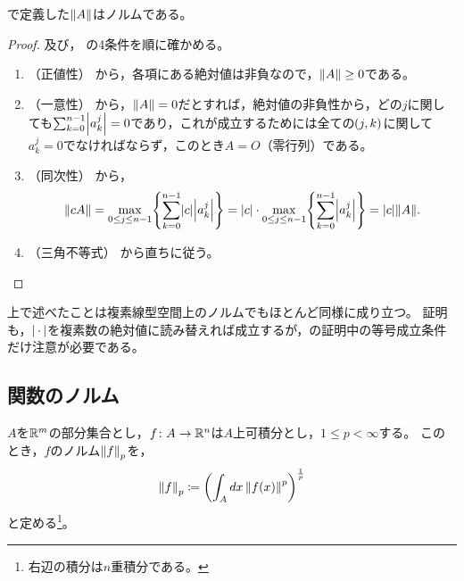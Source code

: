 \documentclass[b5paper,draft]{ltjsbook}
\begin{document}
\begin{prop}
    で定義した$\norm{A}$はノルムである。
    \begin{proof}
        及び，
        の4条件を順に確かめる。
        \begin{enumerate}[label=(\roman*)]
            \item （正値性）
            から，各項にある絶対値は非負なので，$\norm{A} \geq 0$である。

            \item （一意性）
            から，$\norm{A}=0$だとすれば，絶対値の非負性から，どの$j$に関しても$\sum_{k=0}^{n-1}\abs{a^j_k}=0$であり，これが成立するためには全ての$\pare{j,k}$に関して$a^j_k=0$でなければならず，このとき$A=O$（零行列）である。

            \item （同次性）
            から，
            \begin{equation}
                \norm{cA}=\max_{0\leq j\leq n-1} \bra{\sum_{k=0}^{n-1} \abs{c}\abs{a^j_k}}=\abs{c}\cdot \max_{0\leq j\leq n-1} \bra{\sum_{k=0}^{n-1} \abs{a^j_k}}=\abs{c}\norm{A}.
            \end{equation}

            \item （三角不等式）
            から直ちに従う。
        \end{enumerate}
    \end{proof}
\end{prop}

\begin{rem}
    上で述べたことは複素線型空間上のノルムでもほとんど同様に成り立つ。
    証明も，$\abs{\dummy}$を複素数の絶対値に読み替えれば成立するが，の証明中の等号成立条件だけ注意が必要である。
\end{rem}


\subsection{関数のノルム}
\begin{defi}[$L^p$ノルム]
    $A$を$\mathbb{R}^m$の部分集合とし，$f\colon A\to \mathbb{R}^n$は$A$上可積分とし，$1\leq p <\infty$する。
    このとき，$f$のノルム$\norm{f}_p$を，
    \begin{equation}
        \norm{f}_p \coloneqq \pare{\int_A dx\, \norm{\fun{f}{x}}^p}^{\frac{1}{p}}
    \end{equation}
    と定める\footnote{右辺の積分は$n$重積分である。}。
\end{defi}
\end{document}

